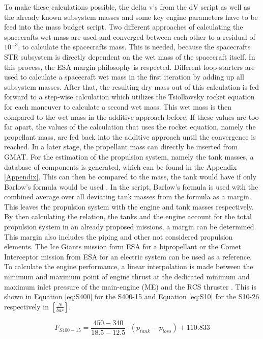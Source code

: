 To make these calculations possible, the delta v's from the dV script as well as the already known subsystem masses and some key engine parameters have to be feed into the mass budget script. Two different approaches of calculating the spacecrafts wet mass are used and converged between each other to a residual of $10^{-3}$, to calculate the spacecrafts mass. This is needed, because the spacecrafts STR subsystem is directly dependent on the wet mass of the spacecraft itself. In this process, the ESA margin philosophy \cite{ESA.2012} is respected. Different loop-starters are used to calculate a spacecraft wet mass in the first iteration by adding up all subsystem masses. After that, the resulting dry mass out of this calculation is fed forward to a step-wise calculation which utilizes the Tsiolkovsky rocket equation for each maneuver \cite{Walter.2018} to calculate a second wet mass. This wet mass is then compared to the wet mass in the additive approach before. If these values are too far apart, the values of the calculation that uses the rocket equation, namely the propellant mass, are fed back into the additive approach until the convergence is reached. In a later stage, the propellant mass can directly be inserted from GMAT. 
For the estimation of the propulsion system, namely the tank masses, a database of components is generated, which can be found in the Appendix \ref{Appendix}. This can then be compared to the mass, the tank would have if only Barlow's formula would be used \cite{Manfletti.2022}. In the script, Barlow's formula is used with the combined average over all deviating tank masses from the formula as a margin. This leaves the propulsion system with the engine and tank masses respectively. By then calculating the relation, the tanks and the engine account for the total propulsion system in an already proposed missions, a margin can be determined. This margin also includes the piping and other not considered propulsion elements. The Ice Giants mission form ESA \cite{ESA.2019} for a bipropellant or the Comet Interceptor mission from ESA \cite{CDF.2019} for an electric system can be used as a reference. To calculate the engine performance, a linear interpolation is made between the minimum and maximum point of engine thrust at the dedicated minimum and maximum inlet pressure of the main-engine (ME) and the RCS thruster \cite{Ariane.2023}. This is shown in Equation \ref{eq:S400} for the S400-15 and Equation \ref{eq:S10} for the S10-26 respectively in $[\frac {N}{bar}]$.

\begin{equation}
F_{S400-15} = \frac {450-340}{18.5-12.5} \cdot (p_{tank}-p_{loss}) + 110.833
\label{eq:S400}
\end{equation}

